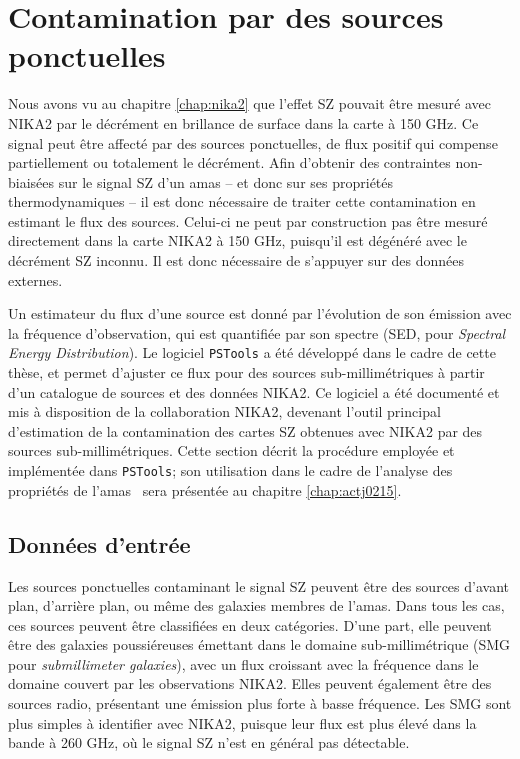\section{Contamination par des sources ponctuelles}
\label{sec:decor:pstools}

Nous avons vu au chapitre \ref{chap:nika2} que l'effet SZ pouvait être mesuré avec NIKA2 par le décrément en brillance de surface dans la carte à 150 GHz.
Ce signal peut être affecté par des sources ponctuelles, de flux positif qui compense partiellement ou totalement le décrément.
Afin d'obtenir des contraintes non-biaisées sur le signal SZ d'un amas -- et donc sur ses propriétés thermodynamiques -- il est donc nécessaire de traiter cette contamination en estimant le flux des sources.
Celui-ci ne peut par construction pas être mesuré directement dans la carte NIKA2 à 150 GHz, puisqu'il est dégénéré avec le décrément SZ inconnu.
Il est donc nécessaire de s'appuyer sur des données externes.

Un estimateur du flux d'une source est donné par l'évolution de son émission avec la fréquence d'observation, qui est quantifiée par son spectre (SED, pour \textit{Spectral Energy Distribution}).
Le logiciel \texttt{PSTools} a été développé dans le cadre de cette thèse, et permet d'ajuster ce flux pour des sources sub-millimétriques à partir d'un catalogue de sources et des données NIKA2.
Ce logiciel a été documenté \cite{keruzore_pstools_2019} et mis à disposition de la collaboration NIKA2, devenant l'outil principal d'estimation de la contamination des cartes SZ obtenues avec NIKA2 par des sources sub-millimétriques.
Cette section décrit la procédure employée et implémentée dans \texttt{PSTools}; son utilisation dans le cadre de l'analyse des propriétés de l'amas \act\ sera présentée au chapitre \ref{chap:actj0215}.

\subsection{Données d'entrée}

Les sources ponctuelles contaminant le signal SZ peuvent être des sources d'avant plan, d'arrière plan, ou même des galaxies membres de l'amas.
Dans tous les cas, ces sources peuvent être classifiées en deux catégories.
D'une part, elle peuvent être des galaxies poussiéreuses émettant dans le domaine sub-millimétrique (SMG pour \textit{submillimeter galaxies}), avec un flux croissant avec la fréquence dans le domaine couvert par les observations NIKA2.
Elles peuvent également être des sources radio, présentant une émission plus forte à basse fréquence\footnotemark.
Les SMG sont plus simples à identifier avec NIKA2, puisque leur flux est plus élevé dans la bande à 260 GHz, où le signal SZ n'est en général pas détectable.

